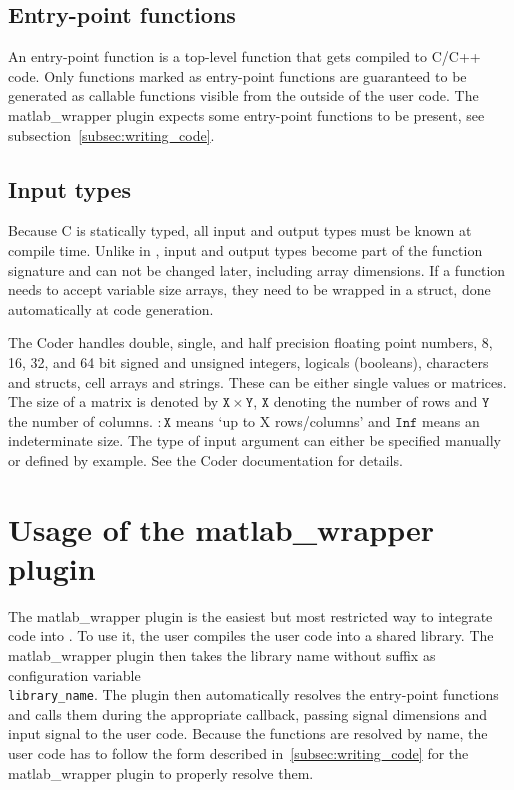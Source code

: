 \documentclass[11pt,a4paper,twoside]{article}
\newcommand{\+}{\discretionary{\mbox{\scriptsize$\hookleftarrow$}}{}{}}
\begin{document}
\subsection*{Entry-point functions}
An entry-point function is a top-level \Matlab{} function that gets compiled to
C/C++ code. Only functions marked as entry-point functions are guaranteed to be
generated as callable functions visible from the outside of the user code. The
matlab\_wrapper plugin expects some entry-point functions to be present, see
subsection~\ref{subsec:writing_code}.

\subsection*{Input types}
Because C is statically typed, all input and output types must be known at
compile time. Unlike in \Matlab{}, input and output types become part of the
function signature and can not be changed later, including array dimensions.
If a function needs to accept variable size arrays, they need to be wrapped
in a struct, done automatically at code generation.

The \Matlab{} Coder handles double, single, and half precision floating point
numbers, 8, 16, 32, and 64 bit signed and unsigned integers, logicals
(booleans), characters and structs, cell arrays and strings. These can be either single values or
matrices. The size of a matrix is denoted by $\mathtt{\!X} \times \mathtt{\!Y}$, $\mathtt{\!X}$ denoting the number
of rows and $\mathtt{\!Y}$ the number of columns. $\mathtt{:\!X}$ means `up to X rows/columns' and $\mathtt{Inf}$
means an indeterminate size. The type of input argument can either be specified
manually or defined by example. See the \Matlab{} Coder documentation for
details.

\section{Usage of the matlab\_wrapper plugin}\label{sec:wrapper plugin}

The matlab\_wrapper plugin is the easiest but most restricted way to integrate
\Matlab{} code into \mha{}. To use it, the user compiles the user code into a
shared library. The matlab\_wrapper plugin then takes the library name without
suffix as configuration variable\\ \texttt{library\_name}. The plugin then automatically
resolves the entry-point functions and calls them during the appropriate
callback, passing signal dimensions and input signal to the user code. Because
the functions are resolved by name, the user code has to follow the form
described in~\ref{subsec:writing_code} for the matlab\_wrapper plugin to
properly resolve them.
\end{document}
